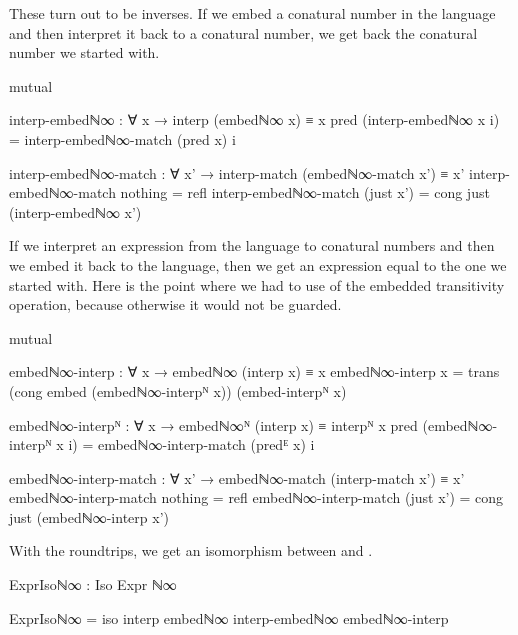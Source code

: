 These turn out to be inverses. If we embed a conatural number in the language
and then interpret it back to a conatural number, we get back the conatural
number we started with.
\begin{code}[hide]
mutual
\end{code}
\begin{code}
  interp-embedℕ∞ : ∀ x → interp (embedℕ∞ x) ≡ x
  pred (interp-embedℕ∞ x i) =
    interp-embedℕ∞-match (pred x) i

  interp-embedℕ∞-match :
    ∀ x' → interp-match (embedℕ∞-match x') ≡ x'
  interp-embedℕ∞-match nothing    = refl
  interp-embedℕ∞-match (just x')  =
    cong just (interp-embedℕ∞ x')
\end{code}
If we interpret an expression from the language to conatural numbers and then we
embed it back to the language, then we get an expression equal to the one we
started with. Here is the point where we had to use of the embedded transitivity
operation, because otherwise it would not be guarded.
\begin{code}[hide]
mutual
\end{code}
\begin{code}
  embedℕ∞-interp : ∀ x → embedℕ∞ (interp x) ≡ x
  embedℕ∞-interp x =
    trans
      (cong embed (embedℕ∞-interpᴺ x))
      (embed-interpᴺ x)

  embedℕ∞-interpᴺ :
    ∀ x → embedℕ∞ᴺ (interp x) ≡ interpᴺ x
  pred (embedℕ∞-interpᴺ x i) =
    embedℕ∞-interp-match (predᴱ x) i

  embedℕ∞-interp-match :
    ∀ x' → embedℕ∞-match (interp-match x') ≡ x'
  embedℕ∞-interp-match nothing    = refl
  embedℕ∞-interp-match (just x')  =
    cong just (embedℕ∞-interp x')
\end{code}
With the roundtrips, we get an isomorphism between  and
.
\begin{code}
ExprIsoℕ∞ : Iso Expr ℕ∞
\end{code}
\begin{code}[hide]
ExprIsoℕ∞ = iso interp embedℕ∞ interp-embedℕ∞ embedℕ∞-interp
\end{code}

